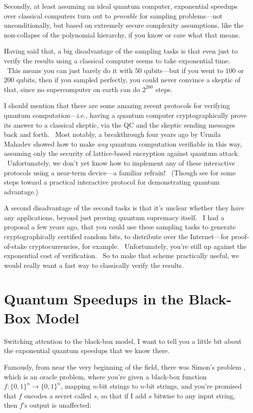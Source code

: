 \documentclass[12pt]{article}
\begin{document}
Secondly, at least assuming an ideal quantum computer, exponential speedups over classical computers turn out to \emph{provable} for sampling problems---not unconditionally, but based on extremely secure complexity assumptions, like the non-collapse of the polynomial hierarchy, if you know or care what that means.

Having said that, a big disadvantage of the sampling tasks is that even just to verify the results using a classical computer seems to take exponential time. \ This means you can just barely do it with $50$ qubits---but if you went to $100$ or $200$ qubits, then if you sampled perfectly, you could never convince a skeptic of that, since no supercomputer on earth can do $2^{200}$ steps.

I should mention that there are some amazing recent protocols for verifying quantum computation---i.e., having a quantum computer cryptographically prove its answer to a classical skeptic, via the QC and the skeptic sending messages back and forth. \ Most notably, a breakthrough four years ago by Urmila Mahadev \cite{mahadev} showed how to make \emph{any} quantum computation verifiable in this way, assuming only the security of lattice-based encryption against quantum attack. \ Unfortunately, we don't yet know how to implement any of these interactive protocols using a near-term device---a familiar refrain! \ (Though see \cite{kcvy} for some steps toward a practical interactive protocol for demonstrating quantum advantage.)

A second disadvantage of the second tasks is that it's unclear whether they have any applications, beyond just proving quantum supremacy itself. \ I had a proposal a few years ago, that you could use these sampling tasks to generate cryptographically certified random bits, to distribute over the Internet---for proof-of-stake cryptocurrencies, for example. \ Unfortunately, you're still up against the exponential cost of verification. \ So to make that scheme practically useful, we would really want a fast way to classically verify the results.


\section{Quantum Speedups in the Black-Box Model}

Switching attention to the black-box model, I want to tell you a little bit about the exponential quantum speedups that we know there.

Famously, from near the very beginning of the field, there was Simon's problem \cite{simon}, which is an oracle problem, where you're given a black-box function $f:\{0,1\}^n \rightarrow \{0,1\}^n$, mapping $n$-bit strings to $n$-bit strings, and you're promised that $f$ encodes a secret called $s$, so that if I add $s$ bitwise to any input string, then $f$'s output is unaffected:
\end{document}
